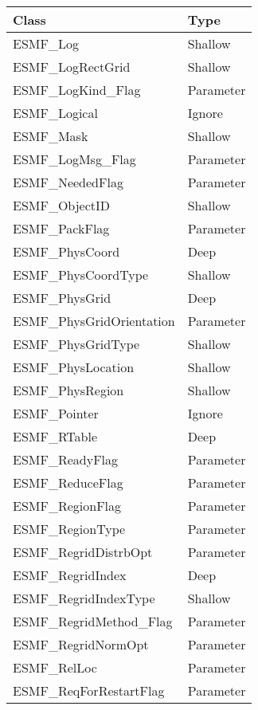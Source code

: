 \begin{table}[t]
\begin{tabular}{ll}

{\bf Class} & {\bf Type} \\ \hline

ESMF\_Log                   & Shallow\\
ESMF\_LogRectGrid           & Shallow\\
ESMF\_LogKind\_Flag               & Parameter \\
ESMF\_Logical               & Ignore\\
ESMF\_Mask                  & Shallow\\
ESMF\_LogMsg\_Flag               & Parameter \\
ESMF\_NeededFlag            & Parameter \\
ESMF\_ObjectID              & Shallow\\
ESMF\_PackFlag              & Parameter \\
ESMF\_PhysCoord             & Deep \\
ESMF\_PhysCoordType         & Shallow\\
ESMF\_PhysGrid              & Deep \\
ESMF\_PhysGridOrientation   & Parameter \\
ESMF\_PhysGridType          & Shallow\\
ESMF\_PhysLocation          & Shallow\\
ESMF\_PhysRegion            & Shallow\\
ESMF\_Pointer               & Ignore\\
ESMF\_RTable                & Deep \\
ESMF\_ReadyFlag             & Parameter \\
ESMF\_ReduceFlag            & Parameter \\
ESMF\_RegionFlag            & Parameter \\
ESMF\_RegionType            & Parameter \\
ESMF\_RegridDistrbOpt       & Parameter \\
ESMF\_RegridIndex           & Deep \\
ESMF\_RegridIndexType       & Shallow\\
ESMF\_RegridMethod\_Flag    & Parameter \\
ESMF\_RegridNormOpt         & Parameter \\
ESMF\_RelLoc                & Parameter \\
ESMF\_ReqForRestartFlag     & Parameter \\

\end{tabular}
\end{table}
